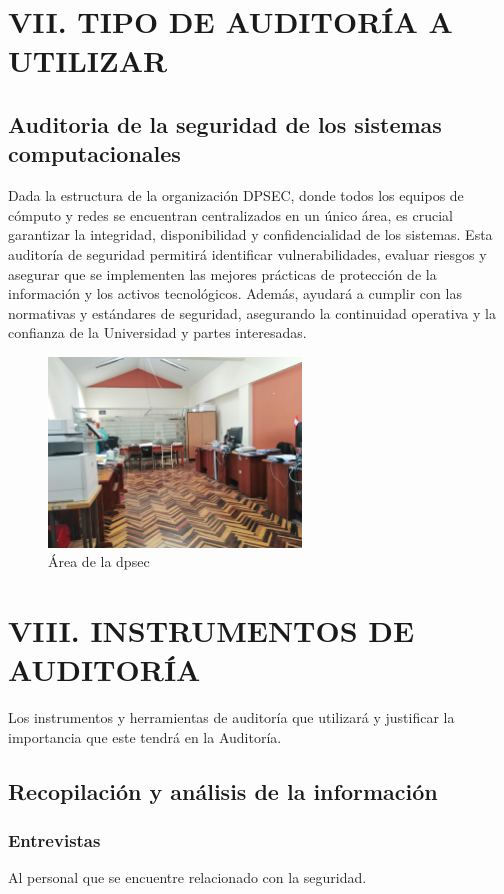 \documentclass[12pt,a4paper]{article}
\begin{document}
\newpage
\section{VII. TIPO DE AUDITORÍA A UTILIZAR}
\subsection{Auditoria de la seguridad de los sistemas computacionales}
Dada la estructura de la organización DPSEC, donde todos los equipos de cómputo y redes se encuentran centralizados en un único área, es crucial garantizar la integridad, disponibilidad y confidencialidad de los sistemas. 
Esta auditoría de seguridad permitirá identificar vulnerabilidades, evaluar riesgos y asegurar que se implementen las mejores prácticas de protección de la información y los activos tecnológicos. 
Además, ayudará a cumplir con las normativas y estándares de seguridad, asegurando la continuidad operativa y la confianza de la Universidad y partes interesadas.
\begin{figure}[!htb]
    \centering
    \includegraphics[width=0.6\textwidth]{images/AreaTrabajo.jpeg}
    \caption{Área de la dpsec}
    
\end{figure}

\newpage
\section{VIII. INSTRUMENTOS DE AUDITORÍA}
Los instrumentos y herramientas de auditoría que utilizará y justificar la importancia que
este tendrá en la Auditoría.
\subsection{Recopilación y análisis de la información}
\subsubsection{Entrevistas}
Al personal que se encuentre relacionado con la seguridad.
\end{document}
